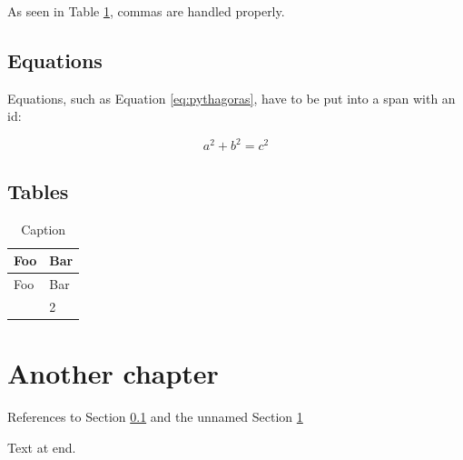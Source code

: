 As seen in Table \ref{tab:foobar}, commas are handled properly.

\hypertarget{equationchapter}{%
\subsection{Equations}\label{equationchapter}}

Equations, such as Equation \ref{eq:pythagoras}, have to be put into a
span with an id:

$$\label{eq:pythagoras}a^2 + b^2 = c^2$$

\hypertarget{tables}{%
\subsection{Tables}\label{tables}}

\begin{longtable}[]{@{}ll@{}}
\caption{Caption}\label{tab:foobar}\tabularnewline
\toprule\noalign{}
Foo & Bar \\
\midrule\noalign{}
\endfirsthead
\toprule\noalign{}
Foo & Bar \\
\midrule\noalign{}
\endhead
\bottomrule\noalign{}
\endlastfoot
1 & 2 \\
\end{longtable}

\hypertarget{another-chapter}{%
\section{Another chapter}\label{another-chapter}}

References to Section \ref{equationchapter} and the unnamed
Section \ref{another-chapter}

Text at end.
